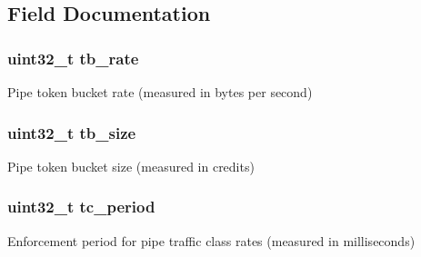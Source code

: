 \subsection{Field Documentation}
\hypertarget{structrte__sched__pipe__params_aa64063ce773f9f838ade073d6165dfe5}{}
\subsubsection[{tb\+\_\+rate}]{\setlength{\rightskip}{0pt plus 5cm}uint32\+\_\+t tb\+\_\+rate}\label{structrte__sched__pipe__params_aa64063ce773f9f838ade073d6165dfe5}
Pipe token bucket rate (measured in bytes per second) \hypertarget{structrte__sched__pipe__params_a195cebdb412ff2ca5b671188f11efec3}{}
\subsubsection[{tb\+\_\+size}]{\setlength{\rightskip}{0pt plus 5cm}uint32\+\_\+t tb\+\_\+size}\label{structrte__sched__pipe__params_a195cebdb412ff2ca5b671188f11efec3}
Pipe token bucket size (measured in credits) \hypertarget{structrte__sched__pipe__params_a9c10b3eb86bcd8d9db80b934a4340e5d}{}
\subsubsection[{tc\+\_\+period}]{\setlength{\rightskip}{0pt plus 5cm}uint32\+\_\+t tc\+\_\+period}\label{structrte__sched__pipe__params_a9c10b3eb86bcd8d9db80b934a4340e5d}
Enforcement period for pipe traffic class rates (measured in milliseconds) \hypertarget{structrte__sched__pipe__params_a2cf879b3b3815b594057ba4dfcbb13bb}{}
